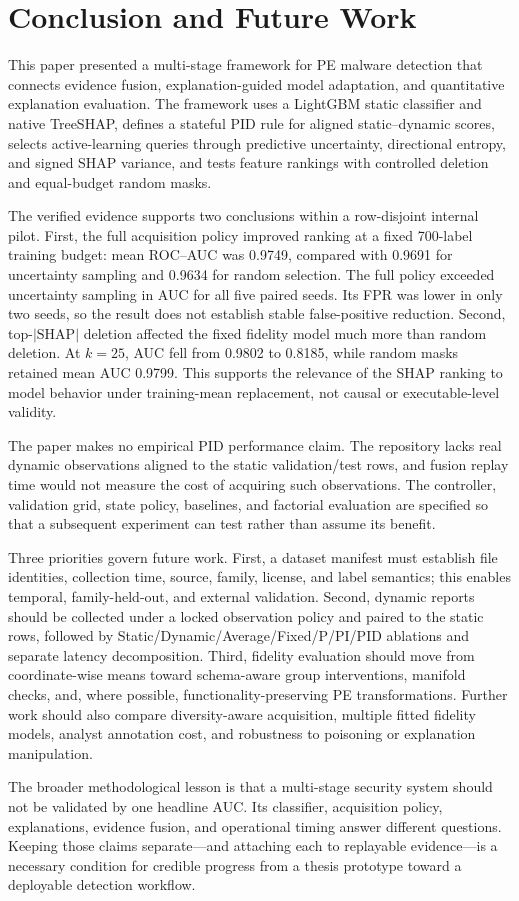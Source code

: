 \section{Conclusion and Future Work}
\label{sec:conclusion}

This paper presented a multi-stage framework for PE malware detection that
connects evidence fusion, explanation-guided model adaptation, and quantitative
explanation evaluation. The framework uses a LightGBM static classifier and
native TreeSHAP, defines a stateful PID rule for aligned static--dynamic scores,
selects active-learning queries through predictive uncertainty, directional
entropy, and signed SHAP variance, and tests feature rankings with controlled
deletion and equal-budget random masks.

The verified evidence supports two conclusions within a row-disjoint internal
pilot. First, the full acquisition policy improved ranking at a fixed 700-label
training budget: mean ROC--AUC was 0.9749, compared with 0.9691 for uncertainty
sampling and 0.9634 for random selection. The full policy exceeded uncertainty
sampling in AUC for all five paired seeds. Its FPR was lower in only two seeds,
so the result does not establish stable false-positive reduction. Second,
top-$|\mathrm{SHAP}|$ deletion affected the fixed fidelity model much more than
random deletion. At $k=25$, AUC fell from 0.9802 to 0.8185, while random masks
retained mean AUC 0.9799. This supports the relevance of the SHAP ranking to model
behavior under training-mean replacement, not causal or executable-level
validity.

The paper makes no empirical PID performance claim. The repository lacks real
dynamic observations aligned to the static validation/test rows, and fusion
replay time would not measure the cost of acquiring such observations. The
controller, validation grid, state policy, baselines, and factorial evaluation
are specified so that a subsequent experiment can test rather than assume its
benefit.

Three priorities govern future work. First, a dataset manifest must establish
file identities, collection time, source, family, license, and label semantics;
this enables temporal, family-held-out, and external validation. Second, dynamic
reports should be collected under a locked observation policy and paired to the
static rows, followed by Static/Dynamic/Average/Fixed/P/PI/PID ablations and
separate latency decomposition. Third, fidelity evaluation should move from
coordinate-wise means toward schema-aware group interventions, manifold checks,
and, where possible, functionality-preserving PE transformations. Further work
should also compare diversity-aware acquisition, multiple fitted fidelity models,
analyst annotation cost, and robustness to poisoning or explanation manipulation.

The broader methodological lesson is that a multi-stage security system should
not be validated by one headline AUC. Its classifier, acquisition policy,
explanations, evidence fusion, and operational timing answer different questions.
Keeping those claims separate---and attaching each to replayable evidence---is a
necessary condition for credible progress from a thesis prototype toward a
deployable detection workflow.
